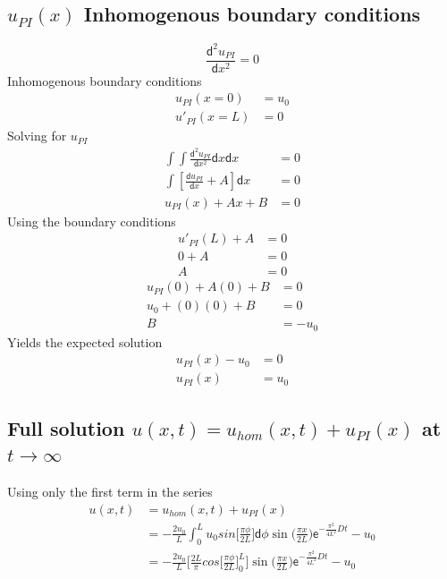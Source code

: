 \documentclass[a4paper]{article}
\begin{document}
\subsection{$u_{PI}(x)$ Inhomogenous boundary conditions}
\begin{equation}
\frac{\mathsf{d}^{2}u_{PI}}{\mathsf{d}x^{2}} = 0
\end{equation}
Inhomogenous boundary conditions
\begin{align*}
u_{PI}(x = 0) &= u_{0} \\
u'_{PI}(x = L) &= 0 
\end{align*}
Solving for $u_{PI}$
\begin{align*}
\int\int\frac{\mathsf{d}^{2}u_{PI}}{\mathsf{d}x^{2}} \mathsf{d}x\mathsf{d}x &= 0 \\
\int[\frac{\mathsf{d}u_{PI}}{\mathsf{d}x} + A]\mathsf{d}x &= 0  \\	
u_{PI}(x) + Ax + B &= 0
\end{align*}
Using the boundary conditions
\begin{align*}
u'_{PI}(L) + A &= 0 \\
0  + A &= 0 \\
A &= 0 
\end{align*}
\begin{align*}
u_{PI}(0) + A(0) + B &= 0 \\
u_{0} + (0)(0) + B &= 0 \\
B &= -u_{0}
\end{align*}
Yields the expected solution
\begin{align}
u_{PI}(x) - u_{0} &= 0 \\
u_{PI}(x)  &= u_{0} 
\end{align}

\subsection{Full solution $u(x,t) = u_{hom}(x,t) + u_{PI}(x)$ at $t \rightarrow \infty$}
Using only the first term in the series
\begin{align*}
  u(x,t) &= u_{hom}(x, t) + u_{PI}(x) \\
	 &=  -\frac{2u_{0}}{L} \int_{0}^{L} u_{0} sin\bigg[\frac{\pi \phi}{2L} \bigg] \mathsf{d}\phi \sin \bigg(\frac{ \pi x}{2L} \bigg) \mathsf{e}^{-\frac{\pi^{2}}{4L^{2}} D t} -u_{0}  \\
	 &=  -\frac{2u_{0}}{L} \bigg[ \frac{2L}{\pi} cos\bigg[\frac{\pi \phi}{2L} \bigg]_{0}^{L} \bigg] \sin \bigg(\frac{ \pi x}{2L} \bigg) \mathsf{e}^{-\frac{\pi^{2}}{4L^{2}	} D t} -u_{0}
\end{align*}
\end{document}
